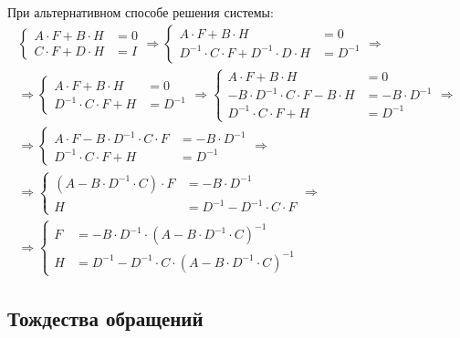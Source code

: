 При альтернативном способе решения системы:
\begin{gather*}
	\left \{
	\begin{array}{cl}
		A \cdot F + B \cdot H & = 0 \\
		C \cdot F + D \cdot H & = I
	\end{array}
	\right .
	\Rightarrow
	\left \{
	\begin{array}{cl}
		A \cdot F + B \cdot H & = 0 \\
		D^{-1} \cdot C \cdot F + D^{-1} \cdot D \cdot H & = D^{-1}
	\end{array}
	\right .
	\Rightarrow \\
	\Rightarrow
	\left \{
	\begin{array}{cl}
		A \cdot F + B \cdot H & = 0 \\
		D^{-1} \cdot C \cdot F + H & = D^{-1}
	\end{array}
	\right .
	\Rightarrow
	\left \{
	\begin{array}{cl}
		A \cdot F + B \cdot H & = 0 \\
		- B \cdot D^{-1} \cdot C \cdot F - B \cdot H & = - B \cdot D^{-1} \\
		D^{-1} \cdot C \cdot F + H & = D^{-1}
	\end{array}
	\right .
	\Rightarrow \\
	\Rightarrow
	\left \{
	\begin{array}{cl}
		A \cdot F - B \cdot D^{-1} \cdot C \cdot F & = - B \cdot D^{-1} \\
		D^{-1} \cdot C \cdot F + H & = D^{-1}
	\end{array}
	\right .
	\Rightarrow \\
	\Rightarrow
	\left \{
	\begin{array}{cl}
		\left ( A - B \cdot D^{-1} \cdot C \right ) \cdot F & = - B \cdot D^{-1} \\
		H & = D^{-1} - D^{-1} \cdot C \cdot F
	\end{array}
	\right .
	\Rightarrow \\
	\Rightarrow
	\left \{
	\begin{array}{cl}
		F & = - B \cdot D^{-1} \cdot \left ( A - B \cdot D^{-1} \cdot C \right )^{-1} \\
		H & = D^{-1} - D^{-1} \cdot C \cdot \left ( A - B \cdot D^{-1} \cdot C \right )^{-1}
	\end{array}
	\right .
\end{gather*}

\subsection{Тождества обращений}

